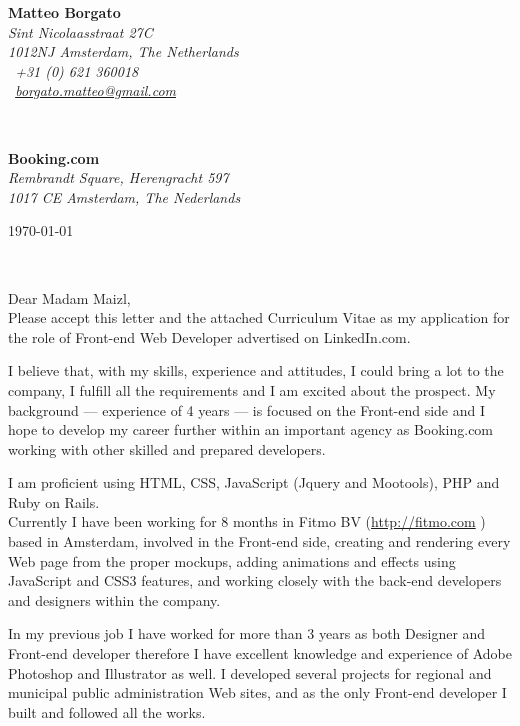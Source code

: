 \documentclass[11pt]{article}
\begin{document}
\sffamily   %
\hfill%
\begin{minipage}[t]{.6\textwidth}
\raggedleft%
{\bfseries Matteo Borgato}\\[.35ex]
\small\itshape%
Sint Nicolaasstraat 27C\\
1012NJ Amsterdam, The Netherlands\\[.35ex]
\Telefon~+31 (0) 621 360018\\
\Letter~\href{mailto:borgato.matteo@gmail.com}{borgato.matteo@gmail.com}
\end{minipage}\\[1em]
%
\begin{minipage}[t]{.4\textwidth}
\raggedright%
{\bfseries Booking.com}\\[.35ex]
\small\itshape%
Rembrandt Square, Herengracht 597\\
1017 CE Amsterdam, The Nederlands
\end{minipage}
\hfill %
\begin{minipage}[t]{.4\textwidth}
\raggedleft %
\today
\end{minipage}\\[2em]
\raggedright
Dear Madam Maizl,\\[0.5em]
%
 Please accept this letter and the attached Curriculum Vitae as my application for the role of Front-end Web Developer advertised on LinkedIn.com.

I believe that, with my skills, experience and attitudes, I could bring a lot to the company, I fulfill all the requirements and I am excited about the prospect. My background --- experience of 4 years --- is focused on the Front-end side and I hope to develop my career further within an important agency as Booking.com working with other skilled and prepared developers.

I am proficient using HTML, CSS, JavaScript (Jquery and Mootools), PHP and Ruby on Rails. \\
Currently I have been working for 8 months in Fitmo BV (\url{http://fitmo.com} ) based in Amsterdam, involved in the Front-end side, creating and rendering every Web page from the proper mockups, adding animations and effects using JavaScript and CSS3 features, and working closely with the back-end developers and designers within the company.

In my previous job I have worked for more than 3 years as both Designer and Front-end developer therefore I have excellent knowledge and experience of Adobe Photoshop and Illustrator as well. I developed several projects for regional and municipal public administration Web sites, and as the only Front-end developer I built and followed all the works.
\end{document}
